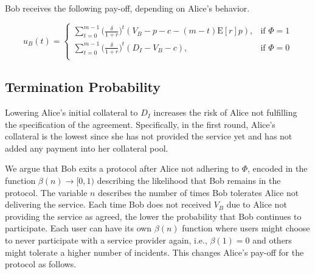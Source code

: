 \documentclass[runningheads]{llncs}
\newcommand{\dom}[1]{\todo[linecolor=green,backgroundcolor=green!25,bordercolor=green,inline,caption={}]{Comment by Dominik: #1}}
\begin{document}



\noindent Bob receives the following pay-off, depending on Alice's behavior.

\begin{equation}
\label{eq:time_bob}
u_B (t) = 
\begin{cases}
    \sum_{t=0}^{m-1} \big( \frac{\delta}{1+r} \big)^t (V_B - p - c - (m-t)\mathrm{E}[r]p), & \text{if $\Phi=1$} \\
    \sum_{t=0}^{m-1} \big( \frac{\delta}{1+r} \big)^t (D_{I} - V_B - c) , & \text{if $\Phi=0$} \\
\end{cases}
\end{equation}


\subsection{Termination Probability}
Lowering Alice's initial collateral to $D_I$ increases the risk of Alice not fulfilling the specification of the agreement.
Specifically, in the first round, Alice's collateral is the lowest since she has not provided the service yet and has not added any payment into her collateral pool.

We argue that Bob exits a protocol after Alice not adhering to $\Phi$, encoded in the function $\beta(n) \to [0,1)$ describing the likelihood that Bob remains in the protocol.
The variable $n$ describes the number of times Bob tolerates Alice not delivering the service.
Each time Bob does not received $V_B$ due to Alice not providing the service as agreed, the lower the probability that Bob continues to participate.
Each user can have its own $\beta(n)$ function where users might choose to never participate with a service provider again, i.e., $\beta(1) = 0$ and others might tolerate a higher number of incidents.
This changes Alice's pay-off for the protocol as follows.
\end{document}
